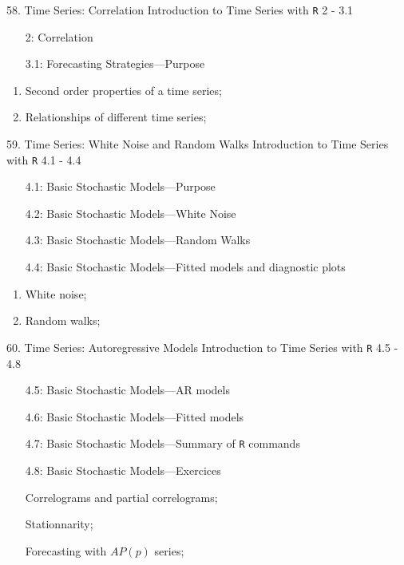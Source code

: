 \documentclass[12pt, titlepage, french]{report}
\begin{document}
\begin{CHPT_SUMM_AUTO}[label = {L.-58}]{58. Time Series: Correlation}
Introduction to Time Series with \texttt{R} 2 - 3.1
\begin{itemize}
	\item[2:]	Correlation
	\item[3.1:]	Forecasting Strategies---Purpose
\end{itemize}
\tcbline
	\begin{enumerate}
		\item	Second order properties of a time series;
		\item	Relationships of different time series;
	\end{enumerate}
\end{CHPT_SUMM_AUTO}

\begin{CHPT_SUMM_AUTO}[label = {L.-59}]{59. Time Series: White Noise and Random Walks}
Introduction to Time Series with \texttt{R} 4.1 - 4.4
\begin{itemize}
	\item[4.1:]	Basic Stochastic Models---Purpose
	\item[4.2:]	Basic Stochastic Models---White Noise
	\item[4.3:]	Basic Stochastic Models---Random Walks
	\item[4.4:]	Basic Stochastic Models---Fitted models and diagnostic plots
\end{itemize}
\tcbline
	\begin{enumerate}
		\item	White noise;
		\item	Random walks;
	\end{enumerate}
\end{CHPT_SUMM_AUTO}

\begin{CHPT_SUMM_AUTO}[label = {L.-60}]{60. Time Series: Autoregressive Models}
Introduction to Time Series with \texttt{R} 4.5 - 4.8
\begin{itemize}
	\item[4.5:]	Basic Stochastic Models---AR models
	\item[4.6:]	Basic Stochastic Models---Fitted models
	\item[4.7:]	Basic Stochastic Models---Summary of \texttt{R} commands
	\item[4.8:]	Basic Stochastic Models---Exercices
\end{itemize}
\tcbline
	\begin{enumerate}
		\item[]	Correlograms and partial correlograms;
		\item[]	Stationnarity;
		\item[]	Forecasting with $AP(p)$ series;
	\end{enumerate}
\end{CHPT_SUMM_AUTO}
\end{document}
